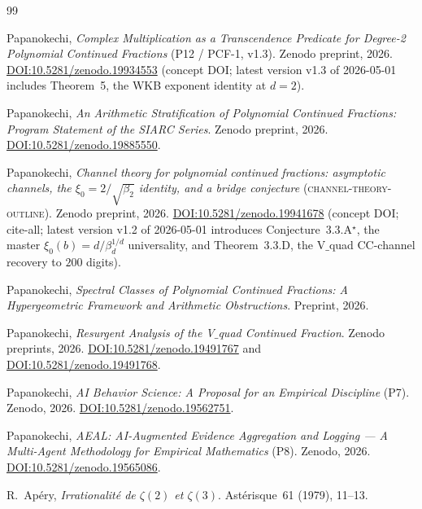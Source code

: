 \documentclass[11pt,a4paper]{article}
\theoremstyle{definition}
\theoremstyle{remark}
\begin{document}
\begin{thebibliography}{99}

Papanokechi, \emph{Complex Multiplication as a Transcendence Predicate
for Degree-2 Polynomial Continued Fractions} (P12 / PCF-1, v1.3).
Zenodo preprint, 2026.
\href{https://doi.org/10.5281/zenodo.19934553}
{DOI:10.5281/zenodo.19934553} (concept DOI; latest version v1.3 of
2026-05-01 includes Theorem~5, the WKB exponent identity at $d=2$).

Papanokechi, \emph{An Arithmetic Stratification of Polynomial Continued
Fractions: Program Statement of the SIARC Series}.
Zenodo preprint, 2026.
\href{https://doi.org/10.5281/zenodo.19885550}
{DOI:10.5281/zenodo.19885550}.

Papanokechi, \emph{Channel theory for polynomial continued fractions:
asymptotic channels, the $\xi_0=2/\sqrt{\beta_2}$ identity, and a
bridge conjecture} (\textsc{channel-theory-outline}). Zenodo
preprint, 2026.
\href{https://doi.org/10.5281/zenodo.19941678}
{DOI:10.5281/zenodo.19941678} (concept DOI; cite-all; latest version
v1.2 of 2026-05-01 introduces Conjecture~3.3.A$^{\star}$, the master
$\xi_0(b)=d/\beta_d^{1/d}$ universality, and Theorem~3.3.D, the
V$\_$quad CC-channel recovery to $200$ digits).

Papanokechi, \emph{Spectral Classes of Polynomial Continued Fractions:
A Hypergeometric Framework and Arithmetic Obstructions}.
Preprint, 2026.

Papanokechi, \emph{Resurgent Analysis of the V$\_$quad Continued
Fraction}.
Zenodo preprints, 2026.
\href{https://doi.org/10.5281/zenodo.19491767}
{DOI:10.5281/zenodo.19491767} and
\href{https://doi.org/10.5281/zenodo.19491768}
{DOI:10.5281/zenodo.19491768}.

Papanokechi, \emph{AI Behavior Science: A Proposal for an Empirical
Discipline} (P7). Zenodo, 2026.
\href{https://doi.org/10.5281/zenodo.19562751}
{DOI:10.5281/zenodo.19562751}.

Papanokechi, \emph{AEAL: AI-Augmented Evidence Aggregation and
Logging --- A Multi-Agent Methodology for Empirical Mathematics} (P8).
Zenodo, 2026.
\href{https://doi.org/10.5281/zenodo.19565086}
{DOI:10.5281/zenodo.19565086}.

R.~Ap\'ery, \emph{Irrationalit\'e de $\zeta(2)$ et $\zeta(3)$}.
Ast\'erisque~61 (1979), 11--13.


\end{thebibliography}
\end{document}
